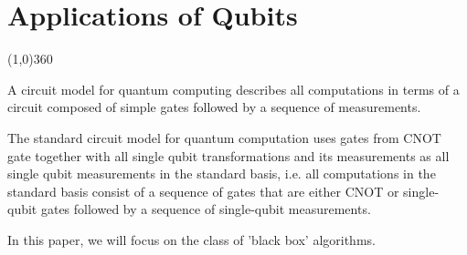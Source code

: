 \chapter{Applications of Qubits}

\line(1,0){360} \\

\begin{comment}
To include:
* Quantum Teleportaion
* Quantum Algorithms can be abstracted as circuits, and these circuits can be represented as a product of matrices
* For any classical circuit, there exists a quantum circuit that performs the computation with similar efficiency
\end{comment}

A circuit model for quantum computing describes all computations in terms of a circuit composed of simple gates followed by a sequence of measurements.

The standard circuit model for quantum computation uses gates from { CNOT gate together with all single qubit transformations} and its measurements as all single qubit measurements in the standard basis, i.e. all computations in the standard basis consist of a sequence of gates that are either CNOT or single-qubit gates followed by a sequence of single-qubit measurements.

In this paper, we will focus on the class of 'black box' algorithms.
